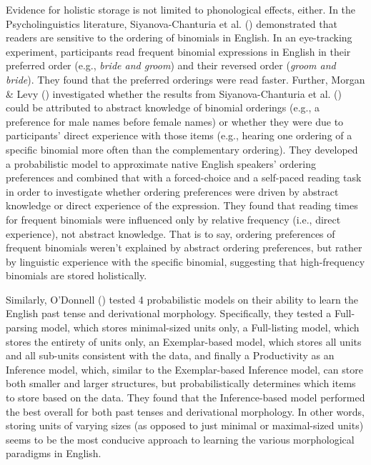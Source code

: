 \documentclass[
  12pt,
  letterpaper,
]{scrreport}
\begin{document}
Evidence for holistic storage is not limited to phonological effects,
either. In the Psycholinguistics literature, Siyanova-Chanturia et al.
()
demonstrated that readers are sensitive to the ordering of binomials in
English. In an eye-tracking experiment, participants read frequent
binomial expressions in English in their preferred order (e.g.,
\emph{bride and groom}) and their reversed order (\emph{groom and
bride}). They found that the preferred orderings were read faster.
Further, Morgan \& Levy
() investigated
whether the results from Siyanova-Chanturia et al.
() could be
attributed to abstract knowledge of binomial orderings (e.g., a
preference for male names before female names) or whether they were due
to participants' direct experience with those items (e.g., hearing one
ordering of a specific binomial more often than the complementary
ordering). They developed a probabilistic model to approximate native
English speakers' ordering preferences and combined that with a
forced-choice and a self-paced reading task in order to investigate
whether ordering preferences were driven by abstract knowledge or direct
experience of the expression. They found that reading times for frequent
binomials were influenced only by relative frequency (i.e., direct
experience), not abstract knowledge. That is to say, ordering
preferences of frequent binomials weren't explained by abstract ordering
preferences, but rather by linguistic experience with the specific
binomial, suggesting that high-frequency binomials are stored
holistically.

Similarly, O'Donnell
() tested 4
probabilistic models on their ability to learn the English past tense
and derivational morphology. Specifically, they tested a Full-parsing
model, which stores minimal-sized units only, a Full-listing model,
which stores the entirety of units only, an Exemplar-based model, which
stores all units and all sub-units consistent with the data, and finally
a Productivity as an Inference model, which, similar to the
Exemplar-based Inference model, can store both smaller and larger
structures, but probabilistically determines which items to store based
on the data. They found that the Inference-based model performed the
best overall for both past tenses and derivational morphology. In other
words, storing units of varying sizes (as opposed to just minimal or
maximal-sized units) seems to be the most conducive approach to learning
the various morphological paradigms in English.
\end{document}
